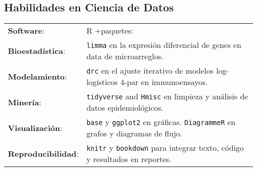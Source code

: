 \documentclass[margin,line]{res}
\begin{document}
\begin{resume}
\section{\sc Habilidades en Ciencia de Datos}%
\begin{tabular}{ l l }
	{\bf Software}: &  R +paquetes:\\ %
	{\bf Bioestadística}: & \texttt{limma} en la expresión diferencial de genes en data de microarreglos.\\ 
	{\bf Modelamiento}: & \texttt{drc} en el ajuste iterativo de modelos log-logísticos 4-par en immunoensayos.\\
	{\bf Minería}: & \texttt{tidyverse} and \texttt{Hmisc} en limpieza y análisis de datos epidemiológicos.\\
	{\bf Visualización}: & \texttt{base} y \texttt{ggplot2} en gráficas. \texttt{DiagrammeR} en grafos y diagramas de flujo.\\ 
	{\bf Reproducibilidad}: & \texttt{knitr} y \texttt{bookdown} para integrar texto, código y resultados en reportes.
\end{tabular}


\end{resume}
\end{document}
